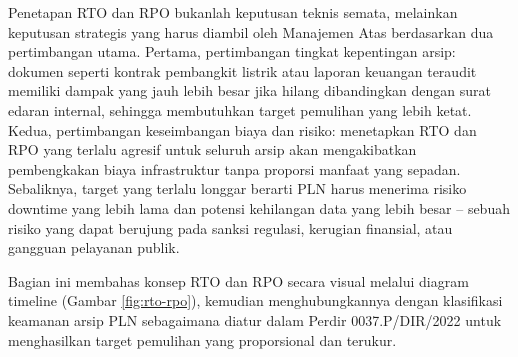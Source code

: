 \documentclass[12pt,a4paper]{report}
\begin{document}
Penetapan RTO dan RPO bukanlah keputusan teknis semata, melainkan keputusan strategis yang harus diambil oleh Manajemen Atas berdasarkan dua pertimbangan utama. Pertama, pertimbangan tingkat kepentingan arsip: dokumen seperti kontrak pembangkit listrik atau laporan keuangan teraudit memiliki dampak yang jauh lebih besar jika hilang dibandingkan dengan surat edaran internal, sehingga membutuhkan target pemulihan yang lebih ketat. Kedua, pertimbangan keseimbangan biaya dan risiko: menetapkan RTO dan RPO yang terlalu agresif untuk seluruh arsip akan mengakibatkan pembengkakan biaya infrastruktur tanpa proporsi manfaat yang sepadan. Sebaliknya, target yang terlalu longgar berarti PLN harus menerima risiko downtime yang lebih lama dan potensi kehilangan data yang lebih besar -- sebuah risiko yang dapat berujung pada sanksi regulasi, kerugian finansial, atau gangguan pelayanan publik.

Bagian ini membahas konsep RTO dan RPO secara visual melalui diagram timeline (Gambar \ref{fig:rto-rpo}), kemudian menghubungkannya dengan klasifikasi keamanan arsip PLN sebagaimana diatur dalam Perdir 0037.P/DIR/2022 untuk menghasilkan target pemulihan yang proporsional dan terukur.

\end{document}
